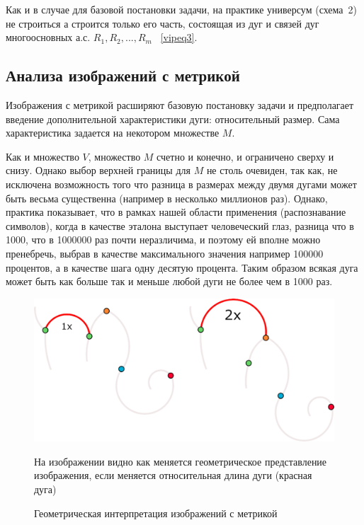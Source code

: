 \begin{remark}
Как и в случае для базовой постановки задачи, на практике универсум (схема~2) не строиться а строится только его часть, состоящая из дуг и связей дуг многоосновных а.с.  $R_1,R_2 , ..., R_m$ ~\ref{vipeq3}.
\end{remark}

\subsection{Анализа изображений с метрикой}

Изображения с метрикой расширяют базовую постановку задачи и предполагает введение дополнительной характеристики дуги: относительный размер. Сама характеристика задается на некотором множестве $M$.

Как и множество $V$, множество $M$ счетно и конечно, и ограничено сверху и снизу. Однако выбор верхней границы для $M$ не столь очевиден, так как, не исключена возможность того что разница в размерах между двумя дугами может быть весьма существенна (например в несколько миллионов раз). Однако, практика показывает, что в рамках нашей области применения (распознавание символов), когда в качестве эталона выступает человеческий глаз, разница что в 1000, что в 1000000 раз почти неразличима, и поэтому ей вполне можно пренебречь, выбрав в качестве максимального значения например 100000 процентов, а в качестве шага одну десятую процента. Таким образом всякая дуга может быть как больше так и меньше любой дуги не более чем в 1000 раз.

\begin{figure}[h]
\centering
\includegraphics[width=0.85\linewidth,keepaspectratio]{images/metrics}
\caption{Геометрическая интерпретация изображений с метрикой}
\medskip
\small
На изображении видно как меняется геометрическое представление изображения, если меняется относительная длина дуги (красная дуга)
\end{figure}

